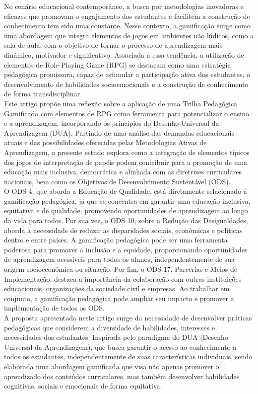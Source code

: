 No cenário educacional contemporâneo, a busca por metodologias inovadoras e eficazes que promovam o engajamento dos estudantes e facilitem a construção de conhecimento tem sido uma constante. Nesse contexto, a gamificação surge como uma abordagem que integra elementos de jogos em ambientes não lúdicos, como a sala de aula, com o objetivo de tornar o processo de aprendizagem mais dinâmico, motivador e significativo. Associada a essa tendência, a utilização de elementos de Role-Playing Game (RPG) se destacam como uma estratégia pedagógica promissora, capaz de estimular a participação ativa dos estudantes, o desenvolvimento de habilidades socioemocionais e a construção de conhecimento de forma transdisciplinar.
\\

Este artigo propõe uma reflexão sobre a aplicação de uma Trilha Pedagógica Gamificada com elementos de RPG como ferramenta para potencializar o ensino e a aprendizagem, incorporando os princípios do Desenho Universal da Aprendizagem (DUA). Partindo de uma análise das demandas educacionais atuais e das possibilidades oferecidas pelas Metodologias Ativas de Aprendizagem, o presente estudo explora como a integração de elementos típicos dos jogos de interpretação de papéis podem contribuir para a promoção de uma educação mais inclusiva, democrática e alinhada com as diretrizes curriculares nacionais, bem como os Objetivos de Desenvolvimento Sustentável (ODS).
\\

O ODS 4, que aborda a Educação de Qualidade, está diretamente relacionado à gamificação pedagógica, já que se concentra em garantir uma educação inclusiva, equitativa e de qualidade, promovendo oportunidades de aprendizagem ao longo da vida para todos. Por sua vez, o ODS 10, sobre a Redução das Desigualdades, aborda a necessidade de reduzir as disparidades sociais, econômicas e políticas dentro e entre países. A gamificação pedagógica pode ser uma ferramenta poderosa para promover a inclusão e a equidade, proporcionando oportunidades de aprendizagem acessíveis para todos os alunos, independentemente de sua origem socioeconômica ou situação. Por fim, o ODS 17, Parcerias e Meios de Implementação, destaca a importância da colaboração com outras instituições educacionais, organizações da sociedade civil e empresas. Ao trabalhar em conjunto, a gamificação pedagógica pode ampliar seu impacto e promover a implementação de todos os ODS.
\\

A proposta apresentada neste artigo surge da necessidade de desenvolver práticas pedagógicas que considerem a diversidade de habilidades, interesses e necessidades dos estudantes. Inspirada pelo paradigma do DUA (Desenho Universal da Aprendizagem), que busca garantir o acesso ao conhecimento a todos os estudantes, independentemente de suas características individuais, sendo elaborada uma abordagem gamificada que visa não apenas promover o aprendizado dos conteúdos curriculares, mas também desenvolver habilidades cognitivas, sociais e emocionais de forma equitativa.
\\

